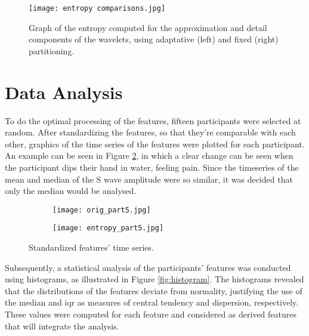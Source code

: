 \begin{figure}[h!]
    \centering
    \texttt{[image: entropy comparisons.jpg]}
    \caption{Graph of the entropy computed for the approximation and detail components of the wavelets, using adaptative (left) and fixed (right) partitioning.}
    \label{fig:entropies}
\end{figure}



\section{Data Analysis}
To do the optimal processing of the features, fifteen participants were selected at random. After standardizing the features, so that they're comparable with each other, graphics of the time series of the features were plotted for each participant. An example can be seen in Figure \ref{fig:featurestimeseries}, in which a clear change can be seen when the participant dips their hand in water, feeling pain. Since the timeseries of the mean and median of the S wave amplitude were so similar, it was decided that only the median would be analysed.


\begin{figure}[htbp]
    \centering
    \begin{subfigure}{\linewidth}
        \centering
        \texttt{[image: orig\_part5.jpg]}
    \end{subfigure}
    
    \vspace{0.1em} %
    
    \begin{subfigure}{\linewidth}
        \centering
        \texttt{[image: entropy\_part5.jpg]}
    \end{subfigure}
    
    \caption{Standardized features' time series.}
    \label{fig:featurestimeseries}
\end{figure}


Subsequently, a statistical analysis of the participants' features was conducted using histograms, as illustrated in Figure \ref{fig:histogram}. The histograms revealed that the distributions of the features deviate from normality, justifying the use of the median and \ac{iqr} as measures of central tendency and dispersion, respectively.
These values were computed for each feature and considered as derived features that will integrate the analysis.


